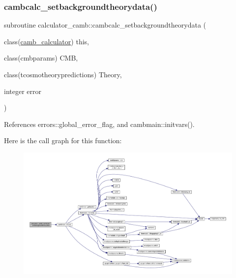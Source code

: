 \subsubsection{\texorpdfstring{cambcalc\+\_\+setbackgroundtheorydata()}{cambcalc\_setbackgroundtheorydata()}}
{\footnotesize\ttfamily subroutine calculator\+\_\+camb\+::cambcalc\+\_\+setbackgroundtheorydata (\begin{DoxyParamCaption}\item[{class(\mbox{\hyperlink{structcalculator__camb_1_1camb__calculator}{camb\+\_\+calculator}})}]{this,  }\item[{class(cmbparams)}]{C\+MB,  }\item[{class(tcosmotheorypredictions)}]{Theory,  }\item[{integer}]{error }\end{DoxyParamCaption})}



References errors\+::global\+\_\+error\+\_\+flag, and cambmain\+::initvars().

Here is the call graph for this function\+:
\nopagebreak
\begin{figure}[H]
\begin{center}
\leavevmode
\includegraphics[width=350pt]{namespacecalculator__camb_a04c53e5b4763297e232978e627153a17_cgraph}
\end{center}
\end{figure}
\mbox{\label{namespacecalculator__camb_a30b5dc9bda2ffcd939436fbc93322f9e}} 

